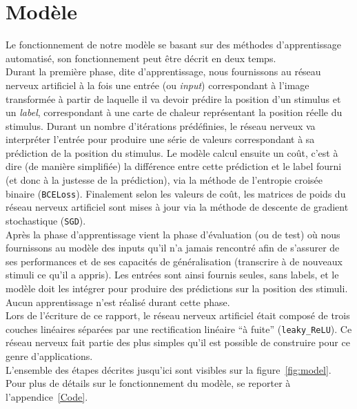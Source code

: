 \section{Modèle}
Le fonctionnement de notre modèle se basant sur des méthodes d'apprentissage automatisé, son fonctionnement peut être décrit en deux temps.\\
Durant la première phase, dite d'apprentissage, nous fournissons au réseau nerveux artificiel à la fois une entrée (ou \textit{input}) correspondant à l'image transformée à partir de laquelle il va devoir prédire la position d'un stimulus et un \textit{label}, correspondant à une carte de chaleur représentant la position réelle du stimulus. 
Durant un nombre d'itérations prédéfinies, le réseau nerveux va interpréter l'entrée pour produire une série de valeurs correspondant à sa prédiction de la position du stimulus.
Le modèle calcul ensuite un coût, c'est à dire (de manière simplifiée) la différence entre cette prédiction et le label fourni (et donc à la justesse de la prédiction), via la méthode de l'entropie croisée binaire (\verb+BCELoss+).
Finalement selon les valeurs de coût, les matrices de poids du réseau nerveux artificiel sont mises à jour via la méthode de descente de gradient stochastique (\verb+SGD+). \\
Après la phase d'apprentissage vient la phase d'évaluation (ou de test) où nous fournissons au modèle des inputs qu'il n'a jamais rencontré afin de s'assurer de ses performances et de ses capacités de généralisation (transcrire à de nouveaux stimuli ce qu'il a appris).
Les entrées sont ainsi fournis seules, sans labels, et le modèle doit les intégrer pour produire des prédictions sur la position des stimuli.
Aucun apprentissage n'est réalisé durant cette phase. \\
Lors de l'écriture de ce rapport, le réseau nerveux artificiel était composé de trois couches linéaires séparées par une rectification linéaire ``à fuite'' (\verb+leaky_ReLU+).
Ce réseau nerveux fait partie des plus simples qu'il est possible de construire pour ce genre d'applications. \\
L'ensemble des étapes décrites jusqu'ici sont visibles sur la figure~\ref{fig:model}.
Pour plus de détails sur le fonctionnement du modèle, se reporter à l'appendice~\ref{Code}.